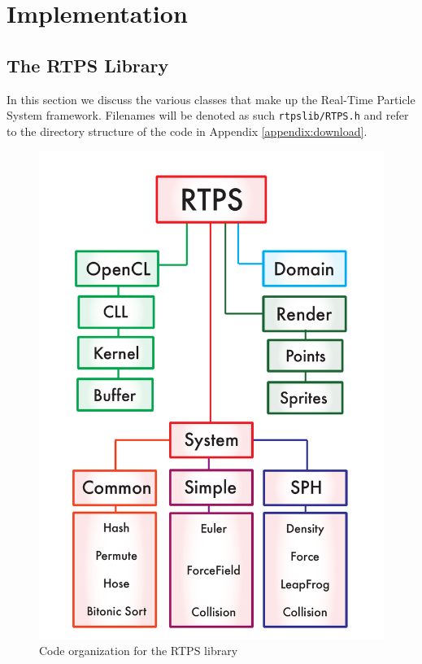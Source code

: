 \chapter{Implementation}

\section{The RTPS Library}

In this section we discuss the various classes that make up the Real-Time
Particle System framework. Filenames will be denoted as such \verb|rtpslib/RTPS.h|
and refer to the directory structure of the code in Appendix \ref{appendix:download}.

\begin{figure}[!htc]
 		\centering
		\includegraphics[scale=0.4]{figures/rtps_flow.pdf}
        \caption{ Code organization for the RTPS library}
		\label{fig:flowchart}
\end{figure}





